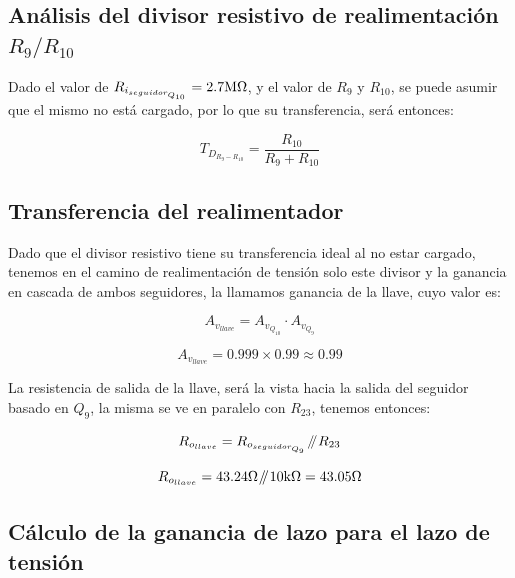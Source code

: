 \label{section:switch_small_signal_end}


\subsection{Análisis del divisor resistivo de realimentación $R_{9}/R_{10}$}

Dado el valor de $R_{i_{seguidor_{Q_{10}}}} = 2.7 \si[per-mode=symbol]{\mega\ohm}$, y el valor de $R_{9}$ y $R_{10}$, se puede asumir que el mismo no está cargado, por lo que su transferencia, será entonces:

\begin{equation}
T_{D_{R_{9}-R_{10}}} = \frac{R_{10}}{R_{9} + R_{10}}
\end{equation}



\subsection{Transferencia del realimentador}

Dado que el divisor resistivo tiene su transferencia ideal al no estar cargado, tenemos en el camino de realimentación de tensión solo este divisor y la ganancia en cascada de ambos seguidores, la llamamos ganancia de la llave, cuyo valor es:


\begin{equation}
A_{v_{llave}} = A_{v_{Q_{10}}} \cdot A_{v_{Q_{9}}}
\end{equation}

\begin{equation*}
A_{v_{llave}} = 0.999 \times 0.99 \approx 0.99
\end{equation*}


La resistencia de salida de la llave, será la vista hacia la salida del seguidor basado en $Q_{9}$, la misma se ve en paralelo con $R_{23}$, tenemos entonces:

\begin{equation}
R_{o_{llave}} = R_{o_{seguidor_{Q_{9}}}} \parallelresistors R_{23}
\end{equation}

\begin{equation*}
R_{o_{llave}} = 43.24 \si[per-mode=symbol]{\ohm} \parallelresistors 10 \si[per-mode=symbol]{\kilo\ohm} = 43.05 \si[per-mode=symbol]{\ohm}
\end{equation*}


\subsection{Cálculo de la ganancia de lazo para el lazo de tensión}

